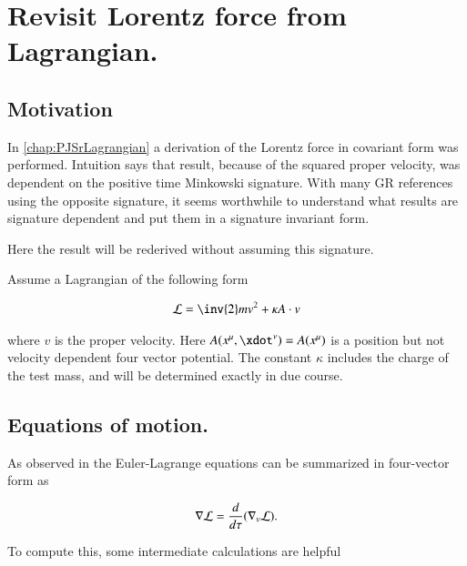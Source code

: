 \chapter{Revisit Lorentz force from Lagrangian.}\label{chap:PJSrLorentzForce}

\section{Motivation }

In \ref{chap:PJSrLagrangian} a derivation of the Lorentz force in covariant
form was performed.  Intuition says that result, because of the squared
proper velocity, was dependent on the 
positive time Minkowski signature.
With many
GR references using the opposite signature, it seems worthwhile to understand
what results are signature dependent and put them in a signature invariant form.

Here the result will be rederived without assuming this signature.

Assume a Lagrangian of the following form

\begin{align}\label{eqn:lorForce:potlag}
\LL = \inv{2}m v^2 + \kappa A \cdot v
\end{align}

where $v$ is the proper velocity.  Here $A(x^\mu,\xdot^\nu) = A(x^\mu)$ is a position but not velocity dependent four vector potential.  The constant $\kappa$ includes the charge of the test mass, and will be determined exactly in due course.

\section{Equations of motion. }

As observed in \cite{PJCanMomentum} the Euler-Lagrange equations can be summarized in four-vector form as

\begin{align}
\nabla \mathcal{L} = \frac{d}{d\tau}(\nabla_v \mathcal{L}).
\end{align}

To compute this, some intermediate calculations are helpful

